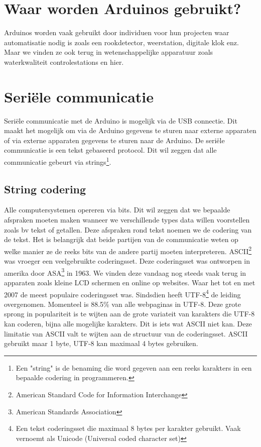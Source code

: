 \documentclass[10pt,twoside]{report}
\newcommand{\pbr}{\hfill\break\hfill\break}
\newcommand{\lbr}{\hfill\break}
\begin{document}
\section{Waar worden Arduinos gebruikt?}
Arduinos worden vaak gebruikt door individuen voor hun projecten waar automatisatie nodig is zoals een rookdetector, weerstation, digitale klok enz. Maar we vinden ze ook terug in wetenschappelijke apparatuur zoals waterkwaliteit controlestations en hier.
\section{Seriële communicatie}
Seriële communicatie met de Arduino is mogelijk via de USB connectie. Dit maakt het mogelijk om via de Arduino gegevens te sturen naar externe apparaten of via externe apparaten gegevens te sturen naar de Arduino.
\pbr
De seriële communicatie is een tekst gebaseerd protocol. Dit wil zeggen dat alle communicatie gebeurt via strings\footnote{Een "string" is de benaming die word gegeven aan een reeks karakters in een bepaalde codering in programmeren.}.\lbr
\subsection{String codering}
Alle computersystemen opereren via bits. Dit wil zeggen dat we bepaalde afspraken moeten maken wanneer we verschillende types data willen voorstellen zoals bv tekst of getallen. Deze afspraken rond tekst noemen we de codering van de tekst. Het is belangrijk dat beide partijen van de communicatie weten op welke manier ze de reeks bits van de andere partij moeten interpreteren.
\pbr
ASCII\footnote{American Standard Code for Information Interchange} was vroeger een veelgebruikte coderingsset. Deze coderingsset was ontworpen in amerika door ASA\footnote{American Standards Association} in 1963. We vinden deze vandaag nog steeds vaak terug in apparaten zoals kleine LCD schermen en online op websites. Waar het tot en met 2007 de meest populaire coderingsset was. Sindsdien heeft UTF-8\footnote{Een tekst coderingsset die maximaal 8 bytes per karakter gebruikt. Vaak vernoemt als Unicode (Universal coded character set)} de leiding overgenomen. Momenteel is 88.5\% van alle webpaginas in UTF-8\cite{w3techs2017}. Deze grote sprong in populariteit is te wijten aan de grote variateit van karakters die UTF-8 kan coderen, bijna alle mogelijke karakters. Dit is iets wat ASCII niet kan. Deze limitatie van ASCII valt te wijten aan de structuur van de coderingsset. ASCII gebruikt maar 1 byte, UTF-8 kan maximaal 4 bytes gebruiken.
\end{document}

